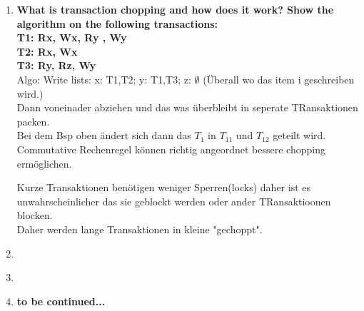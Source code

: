 \documentclass[12pt]{article}\pagestyle{myheadings}
\theoremstyle{plain}
\begin{document}
\begin{enumerate}
\item \textbf{What is transaction chopping and how does it work? Show the algorithm on the following transactions:\\ 
T1: Rx, Wx, Ry , Wy\\
T2: Rx, Wx\\
T3: Ry, Rz, Wy\\
} 
Algo:
Write lists: x: T1,T2; y: T1,T3; z: $\emptyset$ (Überall wo das item i geschreiben wird.)\\
Dann voneinader abziehen und das was überbleibt in seperate TRansaktionen packen.\\
Bei dem Bsp oben ändert sich dann das $T_1$ in $T_{11}$ und $T_{12}$ geteilt wird.\\
Commutative Rechenregel können richtig angeordnet bessere chopping ermöglichen.



Kurze Transaktionen benötigen weniger Sperren(locks) daher ist es unwahrscheinlicher das sie geblockt werden oder ander TRansaktioonen blocken.\\
Daher werden lange Transaktionen in kleine "gechoppt".\\




\item \textbf{} \\
\item \textbf{} \\
\item \textbf{to be continued...} \\


\end{enumerate}
\end{document}
